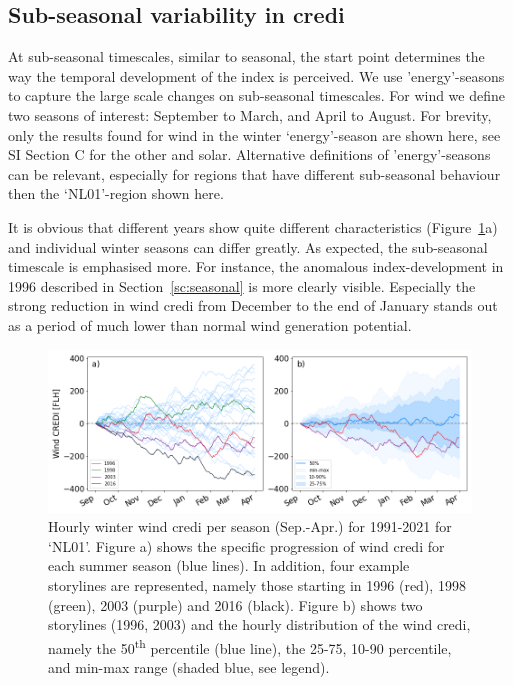 \documentclass[a4paper,11pt]{extarticle}
\newcommand{\ts}[1]{\textsuperscript{#1}}
\newcommand{\credi}[0]{{\sc credi}}
\newcommand{\wdi}[0]{{\sc wind credi}}
\begin{document}
\subsection{Sub-seasonal variability in \credi}\label{sc:subseasonal}
At sub-seasonal timescales, similar to seasonal, the start point determines the way the temporal development of the index is perceived. 
We use 'energy'-seasons to capture the large scale changes on sub-seasonal timescales. 
For wind we define two seasons of interest: September to March, and April to August. 
For brevity, only the results found for wind in the winter `energy'-season are shown here, see SI Section C for the other and solar. 
Alternative definitions of 'energy'-seasons can be relevant, especially for regions that have different sub-seasonal behaviour then the `NL01'-region shown here.

It is obvious that different years show quite different characteristics (Figure~\ref{fig:analysis_sub-season-winter_wind}a) and individual winter seasons can differ greatly. 
As expected, the sub-seasonal timescale is emphasised more. 
For instance, the anomalous index-development in 1996 described in Section~\ref{sc:seasonal} is more clearly visible. 
Especially the strong reduction in \wdi{} from December to the end of January stands out as a period of much lower than normal wind generation potential.

\begin{figure}[t]
        \centering
        \includegraphics[width=\textwidth]{WindCREDI_seasonal-winter} 
        \caption{
                Hourly winter \wdi{} per season (Sep.-Apr.) for 1991-2021 for `NL01'. 
                Figure a) shows the specific progression of \wdi{} for each summer season (blue lines). 
                In addition, four example storylines are represented, namely those starting in 1996 (red), 1998 (green), 2003 (purple) and 2016 (black). 
                Figure b) shows two storylines (1996, 2003) and the hourly distribution of the \wdi{}, namely the 50\ts{th} percentile (blue line), the 25-75, 10-90 percentile, and min-max range (shaded blue, see legend).
        }
        \label{fig:analysis_sub-season-winter_wind}
\end{figure}
\end{document}
